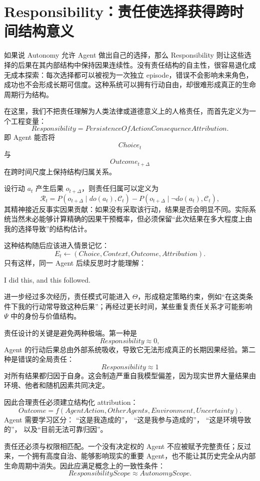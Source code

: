 \section{Responsibility：责任使选择获得跨时间结构意义}

如果说 Autonomy 允许 Agent 做出自己的选择，那么 Responsibility 则让这些选择的后果在其内部结构中保持因果连续性。没有责任结构的自主性，很容易退化成无成本探索：每次选择都可以被视为一次独立 episode，错误不会影响未来角色，成功也不会形成长期可信度。这种系统可以拥有行动自由，却很难形成真正的生命周期行为结构。

在这里，我们不把责任理解为人类法律或道德意义上的人格责任，而首先定义为一个工程变量：
\[
\boxed{
Responsibility
=
PersistenceOfActionConsequenceAttribution.
}
\]
即 Agent 能否将
\[
Choice_t
\]
与
\[
Outcome_{t+\Delta}
\]
在跨时间尺度上保持结构归属关系。

设行动 $a_t$ 产生后果 $o_{t+\Delta}$，则责任归属可以定义为
\[
\mathcal R_t
=
P
\left(
o_{t+\Delta}
\mid
do(a_t),
\mathcal C_t
\right)
-
P
\left(
o_{t+\Delta}
\mid
\neg do(a_t),
\mathcal C_t
\right),
\]
其精神接近反事实因果贡献：如果没有采取该行动，结果是否会明显不同。实际系统当然未必能够计算精确的因果干预概率，但必须保留“此次结果在多大程度上由我的选择导致”的结构估计。

这种结构随后应该进入情景记忆：
\[
E_t
\leftarrow
(
Choice,
Context,
Outcome,
Attribution
).
\]
只有这样，同一 Agent 后续反思时才能理解：
\begin{statementbox}
I did this, and this followed.
\end{statementbox}
进一步经过多次经历，责任模式可能进入 $\Theta$，形成稳定策略约束，例如“在这类条件下我的行动常导致这种后果”；再经过更长时间，某些重复责任关系才可能影响 $\Psi$ 中的身份与价值结构。

责任设计的关键是避免两种极端。第一种是
\[
Responsibility\approx0,
\]
Agent 的行动后果总由外部系统吸收，导致它无法形成真正的长期因果经验。第二种是错误的全局责任：
\[
Responsibility\approx1
\]
对所有结果都归因于自身。这会制造严重自我模型偏差，因为现实世界大量结果由环境、他者和随机因素共同决定。

因此合理责任必须建立结构化 attribution：
\[
Outcome
=
f
(
AgentAction,
OtherAgents,
Environment,
Uncertainty
).
\]
Agent 需要学习区分：
“这是我造成的”，
“这是我参与造成的”，
“这是环境导致的”，
以及“目前无法可靠归因”。

责任还必须与权限相匹配。一个没有决定权的 Agent 不应被赋予完整责任；反过来，一个拥有高度自治、能够影响现实的重要 Agent，也不能让其历史完全从内部生命周期中消失。因此应满足概念上的一致性条件：
\[
\boxed{
ResponsibilityScope
\approx
AutonomyScope.
}
\]

